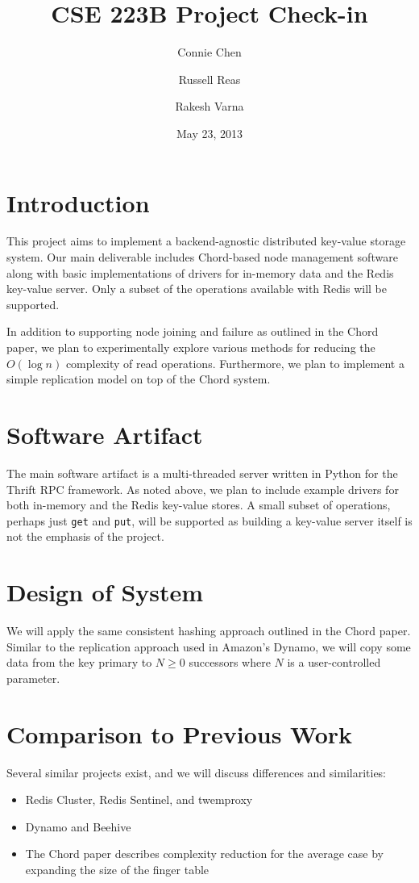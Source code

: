 \documentclass[12pt]{article}
\title{CSE 223B Project Check-in}
\author{Connie Chen \and Russell Reas \and Rakesh Varna}
\date{May 23, 2013}
\begin{document}
\maketitle

\section{Introduction}

This project aims to implement a backend-agnostic distributed key-value storage system.  Our main deliverable includes Chord-based node management software along with basic implementations of drivers for in-memory data and the Redis key-value server.  Only a subset of the operations available with Redis will be supported.

In addition to supporting node joining and failure as outlined in the Chord paper, we plan to experimentally explore various methods for reducing the $O(\log n)$ complexity of read operations.  Furthermore, we plan to implement a simple replication model on top of the Chord system.

\section{Software Artifact}

The main software artifact is a multi-threaded server written in Python for the Thrift RPC framework.  As noted above, we plan to include example drivers for both in-memory and the Redis key-value stores.  A small subset of operations, perhaps just {\tt get} and {\tt put}, will be supported as building a key-value server itself is not the emphasis of the project.  

\section{Design of System}

We will apply the same consistent hashing approach outlined in the Chord paper.  Similar to the replication approach used in Amazon's Dynamo, we will copy some data from the key primary to $N \ge 0$ successors where $N$ is a user-controlled parameter.

\section{Comparison to Previous Work}

Several similar projects exist, and we will discuss differences and similarities:
\begin{itemize}
\item Redis Cluster, Redis Sentinel, and twemproxy
\item Dynamo and Beehive
\item The Chord paper describes complexity reduction for the average case by expanding the size of the finger table
\end{itemize}
\end{document}
